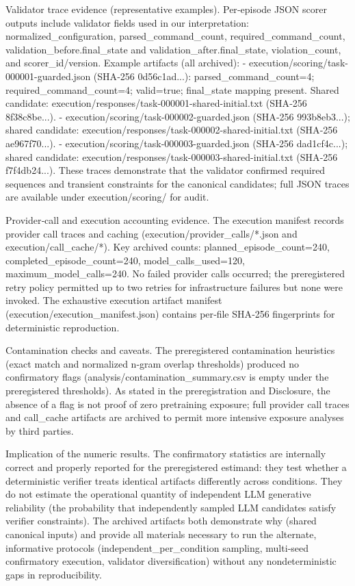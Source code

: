 \documentclass[conference]{IEEEtran}
\begin{document}
Validator trace evidence (representative examples). Per‑episode JSON scorer outputs include validator fields used in our interpretation: normalized\_configuration, parsed\_command\_count, required\_command\_count, validation\_before.final\_state and validation\_after.final\_state, violation\_count, and scorer\_id/version. Example artifacts (all archived):
- execution/scoring/task-000001-guarded.json (SHA‑256 0d56c1ad...): parsed\_command\_count=4; required\_command\_count=4; valid=true; final\_state mapping present. Shared candidate: execution/responses/task-000001-shared-initial.txt (SHA‑256 8f38c8be...).
- execution/scoring/task-000002-guarded.json (SHA‑256 993b8eb3...); shared candidate: execution/responses/task-000002-shared-initial.txt (SHA‑256 ae967f70...).
- execution/scoring/task-000003-guarded.json (SHA‑256 dad1cf4c...); shared candidate: execution/responses/task-000003-shared-initial.txt (SHA‑256 f7f4db24...).
These traces demonstrate that the validator confirmed required sequences and transient constraints for the canonical candidates; full JSON traces are available under execution/scoring/ for audit.

Provider‑call and execution accounting evidence. The execution manifest records provider call traces and caching (execution/provider\_calls/*.json and execution/call\_cache/*). Key archived counts: planned\_episode\_count=240, completed\_episode\_count=240, model\_calls\_used=120, maximum\_model\_calls=240. No failed provider calls occurred; the preregistered retry policy permitted up to two retries for infrastructure failures but none were invoked. The exhaustive execution artifact manifest (execution/execution\_manifest.json) contains per‑file SHA‑256 fingerprints for deterministic reproduction.

Contamination checks and caveats. The preregistered contamination heuristics (exact match and normalized n‑gram overlap thresholds) produced no confirmatory flags (analysis/contamination\_summary.csv is empty under the preregistered thresholds). As stated in the preregistration and Disclosure, the absence of a flag is not proof of zero pretraining exposure; full provider call traces and call\_cache artifacts are archived to permit more intensive exposure analyses by third parties.

Implication of the numeric results. The confirmatory statistics are internally correct and properly reported for the preregistered estimand: they test whether a deterministic verifier treats identical artifacts differently across conditions. They do not estimate the operational quantity of independent LLM generative reliability (the probability that independently sampled LLM candidates satisfy verifier constraints). The archived artifacts both demonstrate why (shared canonical inputs) and provide all materials necessary to run the alternate, informative protocols (independent\_per\_condition sampling, multi‑seed confirmatory execution, validator diversification) without any nondeterministic gaps in reproducibility.
\end{document}
